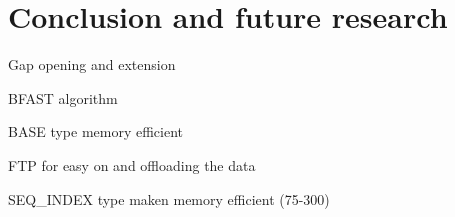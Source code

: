 
\chapter{Conclusion and future research}

Gap opening and extension

BFAST algorithm

BASE type memory efficient

FTP for easy on and offloading the data

SEQ\_INDEX type maken memory efficient (75-300)